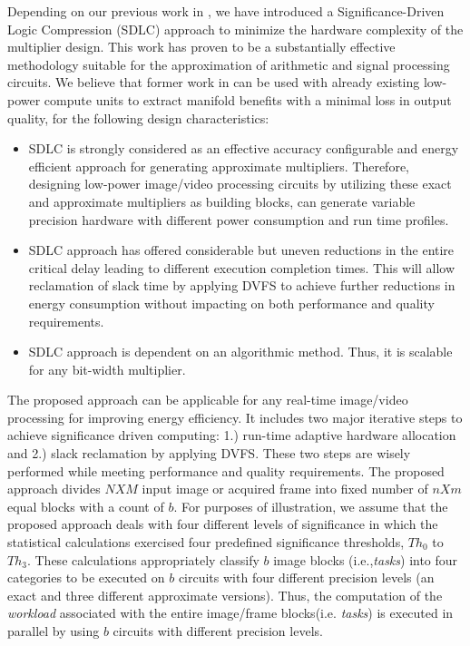 \documentclass[journal]{IEEEtran}
\begin{document}
 Depending on our previous work in \cite{Issa2017}, we have introduced a Significance-Driven Logic Compression (SDLC) approach to minimize the hardware complexity of the multiplier design. This work has proven to be a substantially effective methodology suitable for the approximation of arithmetic and signal processing circuits. We believe that former work in \cite{Issa2017} can be used with already existing low-power compute units to extract manifold benefits with a minimal loss in output quality, for the following design characteristics:\\
\begin{itemize} 
\item SDLC is strongly considered as an effective accuracy configurable and energy efficient approach for generating approximate multipliers. Therefore, designing low-power image/video processing circuits by utilizing these exact and approximate multipliers as building blocks, can generate variable precision hardware with different power consumption and run time profiles.

\item SDLC approach has offered considerable but uneven reductions in the entire critical delay leading to different execution completion times. This will allow reclamation of slack time by applying DVFS to achieve further reductions in energy consumption without impacting on both performance and quality requirements. 
 \item SDLC approach is dependent on an algorithmic method. Thus, it is scalable for any bit-width multiplier.
\end{itemize}

The proposed approach can be applicable for any real-time image/video processing for improving energy efficiency. It includes two major iterative steps to achieve significance driven computing: 1.) run-time adaptive hardware allocation and 2.) slack reclamation by applying DVFS. These two steps are wisely performed while meeting performance and quality requirements. The proposed approach divides $N X M$ input image or acquired frame into fixed number of $n X m$ equal blocks with a count of $b$. For purposes of illustration, we assume that the proposed approach deals with four different levels of significance in which the statistical calculations exercised four predefined significance thresholds, $Th_0$ to $Th_3$. These calculations appropriately classify $b$ image blocks (i.e.,\emph{tasks}) into four categories to be executed on $b$ circuits with four different precision levels (an exact and three different approximate versions). Thus, the computation of the \emph{workload} associated with the entire image/frame blocks(i.e. \emph{tasks}) is executed in parallel by using $b$ circuits with different precision levels.\\
\end{document}
